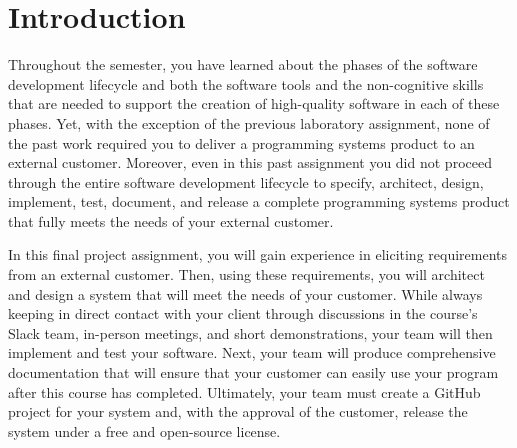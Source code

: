 

\usepackage[compact]{titlesec}

\usepackage[url=false,
    backend=biber,
    style=authoryear,
    doi=false,
    isbn=false,
    backref=false,
    dashed=false,                                   %
    maxnames=99,                                    %
    sorting=ydnt]{biblatex}                         %





\vspace*{-.1in}
\section*{Introduction}

\nocite{*}

Throughout the semester, you have learned about the phases of the software development lifecycle and both the software
tools and the non-cognitive skills that are needed to support the creation of high-quality software in each of these
phases. Yet, with the exception of the previous laboratory assignment, none of the past work required you to deliver a
programming systems product to an external customer. Moreover, even in this past assignment you did not proceed through
the entire software development lifecycle to specify, architect, design, implement, test, document, and release a
complete programming systems product that fully meets the needs of your external customer.

In this final project assignment, you will gain experience in eliciting requirements from an external customer. Then,
using these requirements, you will architect and design a system that will meet the needs of your customer. While always
keeping in direct contact with your client through discussions in the course's Slack team, in-person meetings, and short
demonstrations, your team will then implement and test your software. Next, your team will produce comprehensive
documentation that will ensure that your customer can easily use your program after this course has completed.
Ultimately, your team must create a GitHub project for your system and, with the approval of the customer, release the
system under a free and open-source license.

